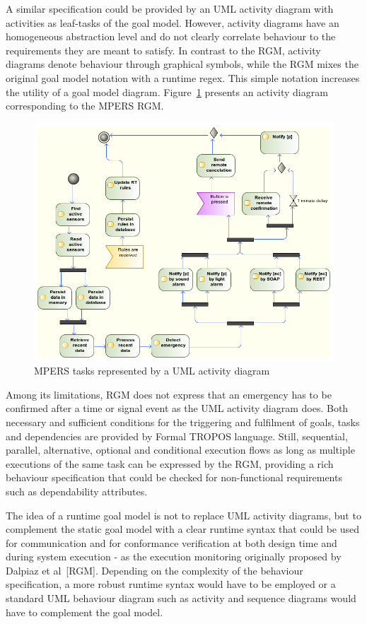 A similar specification could be provided by an UML activity diagram with activities as leaf-tasks of the goal model. However, activity diagrams have an homogeneous abstraction level and do not clearly correlate behaviour to the requirements they are meant to satisfy. In contrast to the RGM, activity diagrams denote behaviour through graphical symbols, while the RGM mixes the original goal model notation with a runtime regex. This simple notation increases the utility of a goal model diagram. Figure~\ref{fig:MPERS_UMLAD} presents an activity diagram corresponding to the MPERS RGM. 

\begin{figure}[h!]
\centering
\includegraphics[width=1\textwidth]{imgs/MPERS_UMLAD.png}
\caption{MPERS tasks represented by a UML activity diagram}
\label{fig:MPERS_UMLAD}
\end{figure}

Among its limitations, RGM does not express that an emergency has to be confirmed after a time or signal event as the UML activity diagram does. Both necessary and sufficient conditions for the triggering and fulfilment of goals, tasks and dependencies are provided by Formal TROPOS language.  Still, sequential, parallel, alternative, optional and conditional execution flows as long as multiple executions of the same task can be expressed by the RGM, providing a rich behaviour specification that could be checked for non-functional requirements such as dependability attributes.

The idea of a runtime goal model is not to replace UML activity diagrams, but to complement the static goal model with a clear runtime syntax that could be used for 
communication and for conformance verification at both design time and during system execution - as the execution monitoring originally proposed by Dalpiaz et al~[RGM]. Depending on the complexity of the behaviour specification, a more robust runtime syntax would have to be employed or a standard UML behaviour diagram such as activity and sequence diagrams would have to complement the goal model.

